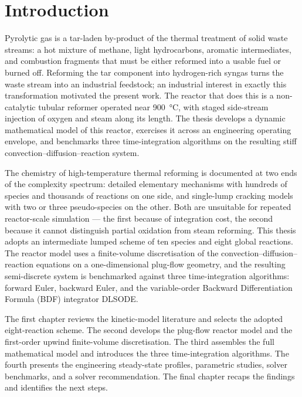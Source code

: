 
\chapter*{Introduction}

Pyrolytic gas is a tar-laden by-product of the thermal treatment of solid waste streams: a hot mixture of methane, light hydrocarbons, aromatic intermediates, and combustion fragments that must be either reformed into a usable fuel or burned off. Reforming the tar component into hydrogen-rich syngas turns the waste stream into an industrial feedstock; an industrial interest in exactly this transformation motivated the present work. The reactor that does this is a non-catalytic tubular reformer operated near \SI{900}{\degreeCelsius}, with staged side-stream injection of oxygen and steam along its length. The thesis develops a dynamic mathematical model of this reactor, exercises it across an engineering operating envelope, and benchmarks three time-integration algorithms on the resulting stiff convection--diffusion--reaction system.

The chemistry of high-temperature thermal reforming is documented at two ends of the complexity spectrum: detailed elementary mechanisms with hundreds of species and thousands of reactions on one side, and single-lump cracking models with two or three pseudo-species on the other. Both are unsuitable for repeated reactor-scale simulation --- the first because of integration cost, the second because it cannot distinguish partial oxidation from steam reforming. This thesis adopts an intermediate lumped scheme of ten species and eight global reactions. The reactor model uses a finite-volume discretisation of the convection--diffusion--reaction equations on a one-dimensional plug-flow geometry, and the resulting semi-discrete system is benchmarked against three time-integration algorithms: forward Euler, backward Euler, and the variable-order Backward Differentiation Formula (BDF) integrator DLSODE.

The first chapter reviews the kinetic-model literature and selects the adopted eight-reaction scheme. The second develops the plug-flow reactor model and the first-order upwind finite-volume discretisation. The third assembles the full mathematical model and introduces the three time-integration algorithms. The fourth presents the engineering steady-state profiles, parametric studies, solver benchmarks, and a solver recommendation. The final chapter recaps the findings and identifies the next steps.
